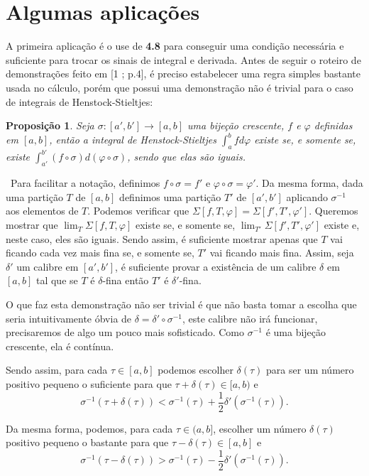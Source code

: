 \documentclass[12pt, a4paper]{article}
\newtheorem{prop}[mydef]{Proposição}
\def\dem{\par\smallbreak\noindent {\textit{ Demonstração:}} \ }
\theoremstyle{definition}
\begin{document}
\section{Algumas aplicações}

A primeira aplicação é o use de \textbf{4.8} para conseguir uma condição necessária e suficiente para trocar os sinais de integral e derivada. Antes de seguir o roteiro de demonstrações feito em [1 ; p.4], é preciso estabelecer uma regra simples bastante usada no cálculo, porém que possui uma demonstração não é trivial para o caso de integrais de Henstock-Stieltjes:  

\begin{prop}
	
	Seja $\sigma: [a',b']\rightarrow [a,b]$ uma bijeção crescente, $f$ e $\varphi$ definidas em $[a,b]$, então a integral de Henstock-Stieltjes $\int_a^b f d\varphi$ existe se, e somente se, existe $\int_{a'}^{b'} (f\circ \sigma) d(\varphi \circ \sigma)$, sendo que elas são iguais. 
	
\end{prop}

\dem Para facilitar a notação, definimos $f\circ \sigma=f'$ e $\varphi \circ \sigma=\varphi'$. Da mesma forma, dada uma partição $T$ de $[a,b]$ definimos uma partição $T'$ de $[a',b']$ aplicando $\sigma^{-1}$ aos elementos de $T$. Podemos verificar que $\Sigma[f,T,\varphi]=\Sigma[f',T',\varphi']$. Queremos mostrar que $\lim_T \Sigma[f,T,\varphi]$ existe se, e somente se, $\lim_{T'} \Sigma[f',T',\varphi']$ existe e, neste caso, eles são iguais. Sendo assim, é suficiente mostrar apenas que $T$ vai ficando cada vez mais fina se, e somente se, $T'$ vai ficando mais fina. Assim, seja $\delta'$ um calibre em $[a',b']$, é suficiente provar a existência de um calibre $\delta$ em $[a,b]$ tal que se $T$ é $\delta$-fina então $T'$ é $\delta'$-fina. 

O que faz esta demonstração não ser trivial é que não basta tomar a escolha que seria intuitivamente óbvia de $\delta=\delta'\circ \sigma^{-1}$, este calibre não irá funcionar, precisaremos de algo um pouco mais sofisticado. Como $\sigma^{-1}$ é uma bijeção crescente, ela é contínua. 

Sendo assim, para cada $\tau\in [a,b]$ podemos escolher $\delta(\tau)$ para ser um número positivo pequeno o suficiente para que $\tau+\delta(\tau)\in [a,b)$ e $$\sigma^{-1}\left(\tau+\delta(\tau)\right)< \sigma^{-1}(\tau)+\frac{1}{2}\delta'\left(\sigma^{-1}(\tau)\right).$$

Da mesma forma, podemos, para cada $\tau\in (a,b]$, escolher um número $\delta(\tau)$ positivo pequeno o bastante para que $\tau - \delta(\tau)\in [a,b]$ e $$\sigma^{-1}\left(\tau-\delta(\tau)\right) > \sigma^{-1}(\tau)-\frac{1}{2}\delta'\left(\sigma^{-1}(\tau)\right).$$
\end{document}
